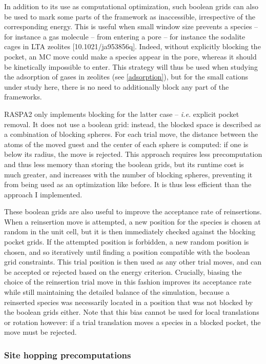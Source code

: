 \documentclass[main.tex]{subfiles}
\begin{document}
In addition to its use as computational optimization, such boolean grids can also be used to mark some parts of the framework as inaccessible, irrespective of the corresponding energy. This is useful when small window size prevents a species -- for instance a gas molecule -- from entering a pore -- for instance the sodalite cages in LTA zeolites [10.1021/ja953856q]. Indeed, without explicitly blocking the pocket, an MC move could make a species appear in the pore, whereas it should be kinetically impossible to enter. This strategy will thus be used when studying the adsorption of gases in zeolites (see \cref{adsorption}), but for the small cations under study here, there is no need to additionally block any part of the frameworks.

RASPA2 only implements blocking for the latter case -- \textit{i.e.} explicit pocket removal. It does not use a boolean grid: instead, the blocked space is described as a combination of blocking spheres. For each trial move, the distance between the atoms of the moved guest and the center of each sphere is computed: if one is below its radius, the move is rejected. This approach requires less precomputation and thus less memory than storing the boolean grids, but its runtime cost is much greater, and increases with the number of blocking spheres, preventing it from being used as an optimization like before. It is thus less efficient than the approach I implemented.

These boolean grids are also useful to improve the acceptance rate of reinsertions. When a reinsertion move is attempted, a new position for the species is chosen at random in the unit cell, but it is then immediately checked against the blocking pocket grids. If the attempted position is forbidden, a new random position is chosen, and so iteratively until finding a position compatible with the boolean grid constraints. This trial position is then used as any other trial moves, and can be accepted or rejected based on the energy criterion. Crucially, biasing the choice of the reinsertion trial move in this fashion improves its acceptance rate while still maintaining the detailed balance of the simulation, because a reinserted species was necessarily located in a position that was not blocked by the boolean grids either. Note that this bias cannot be used for local translations or rotation however: if a trial translation moves a species in a blocked pocket, the move must be rejected.

\subsubsection{Site hopping precomputations}
\end{document}
